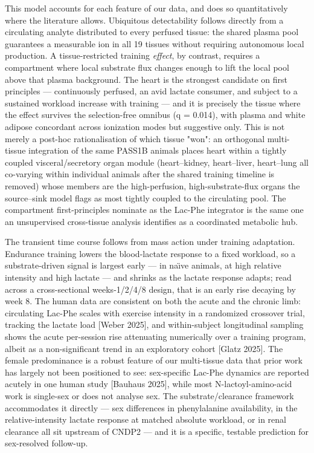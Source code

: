 \documentclass[11pt]{article}
\begin{document}
This model accounts for each feature of our data, and does so quantitatively where the
literature allows. Ubiquitous detectability follows directly from a circulating analyte
distributed to every perfused tissue: the shared plasma pool guarantees a measurable ion in
all 19 tissues without requiring autonomous local production. A tissue-restricted training
\textit{effect}, by contrast, requires a compartment where local substrate flux changes enough to
lift the local pool above that plasma background. The heart is the strongest candidate on
first principles --- continuously perfused, an avid lactate consumer, and subject to a
sustained workload increase with training --- and it is precisely the tissue where the effect
survives the selection-free omnibus (q = 0.014), with plasma and white adipose concordant
across ionization modes but suggestive only. This is not merely a post-hoc rationalisation
of which tissue "won": an orthogonal multi-tissue integration of the same PASS1B animals
places heart within a tightly coupled visceral/secretory organ module (heart--kidney,
heart--liver, heart--lung all co-varying within individual animals after the shared training
timeline is removed) whose members are the high-perfusion, high-substrate-flux organs the
source--sink model flags as most tightly coupled to the circulating pool. The compartment
first-principles nominate as the Lac-Phe integrator is the same one an unsupervised
cross-tissue analysis identifies as a coordinated metabolic hub.

The transient time course follows from mass action under training adaptation. Endurance
training lowers the blood-lactate response to a fixed workload, so a substrate-driven signal
is largest early --- in na\"\i{}ve animals, at high relative intensity and high lactate --- and
shrinks as the lactate response adapts; read across a cross-sectional weeks-1/2/4/8 design,
that is an early rise decaying by week 8. The human data are consistent on both the acute
and the chronic limb: circulating Lac-Phe scales with exercise intensity in a randomized
crossover trial, tracking the lactate load [Weber 2025], and within-subject longitudinal
sampling shows the acute per-session rise attenuating numerically over a training program,
albeit as a non-significant trend in an exploratory cohort [Glatz 2025]. The female
predominance is a robust feature of our multi-tissue data that prior work has largely not been
positioned to see: sex-specific Lac-Phe dynamics are reported acutely in one human study
[Bauhaus 2025], while most N-lactoyl-amino-acid work is single-sex or does not analyse sex. The
substrate/clearance framework accommodates it directly --- sex differences in phenylalanine
availability, in the relative-intensity lactate response at matched absolute workload, or in
renal clearance all sit upstream of CNDP2 --- and it is a specific, testable prediction for
sex-resolved follow-up.
\end{document}
